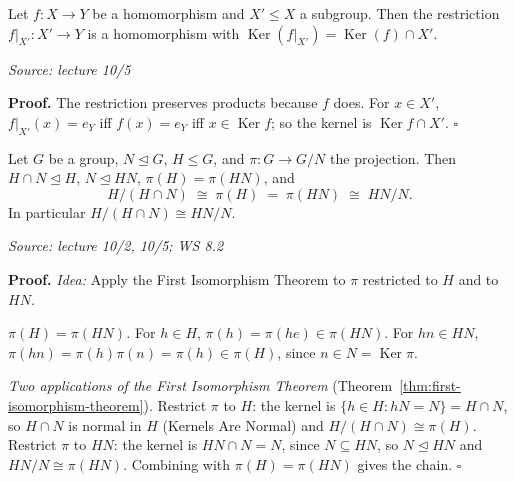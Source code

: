 \documentclass[11pt]{report}
\renewenvironment{proof}[1][Proof]{\noindent\textbf{#1.} }{\hfill$\square$\par\vspace{5pt}}
\newcommand{\srcline}[1]{\par\hfill{\footnotesize\textit{Source: #1}}}
\begin{document}
\begin{lembox}\label{lem:restricting-homomorphism}
Let $f: X \to Y$ be a homomorphism and $X' \leq X$ a subgroup. Then the restriction $f|_{X'}: X' \to Y$ is a homomorphism with $\operatorname{Ker}(f|_{X'}) = \operatorname{Ker}(f) \cap X'$.
\srcline{lecture 10/5}
\end{lembox}

\begin{proof}
The restriction preserves products because $f$ does. For $x \in X'$, $f|_{X'}(x) = e_Y$ iff $f(x) = e_Y$ iff $x \in \operatorname{Ker} f$; so the kernel is $\operatorname{Ker} f \cap X'$.
\end{proof}

\begin{thmbox}\label{thm:second-isomorphism-theorem}
Let $G$ be a group, $N \trianglelefteq G$, $H \leq G$, and $\pi: G \to G/N$ the projection. Then $H \cap N \trianglelefteq H$, $N \trianglelefteq HN$, $\pi(H) = \pi(HN)$, and
\[ H/(H \cap N) \;\cong\; \pi(H) \;=\; \pi(HN) \;\cong\; HN/N. \]
In particular $H/(H \cap N) \cong HN/N$.
\srcline{lecture 10/2, 10/5; WS 8.2}
\end{thmbox}

\begin{proof}
\textit{Idea:} Apply the First Isomorphism Theorem to $\pi$ restricted to $H$ and to $HN$.\par
\emph{$\pi(H) = \pi(HN)$.} For $h \in H$, $\pi(h) = \pi(he) \in \pi(HN)$. For $hn \in HN$, $\pi(hn) = \pi(h)\pi(n) = \pi(h) \in \pi(H)$, since $n \in N = \operatorname{Ker}\pi$.

\emph{Two applications of the First Isomorphism Theorem} (Theorem~\ref{thm:first-isomorphism-theorem}). Restrict $\pi$ to $H$: the kernel is $\{h \in H : hN = N\} = H \cap N$, so $H \cap N$ is normal in $H$ (Kernels Are Normal) and $H/(H \cap N) \cong \pi(H)$. Restrict $\pi$ to $HN$: the kernel is $HN \cap N = N$, since $N \subseteq HN$, so $N \trianglelefteq HN$ and $HN/N \cong \pi(HN)$. Combining with $\pi(H) = \pi(HN)$ gives the chain.
\end{proof}

\begin{center}
\end{center}
\end{document}
